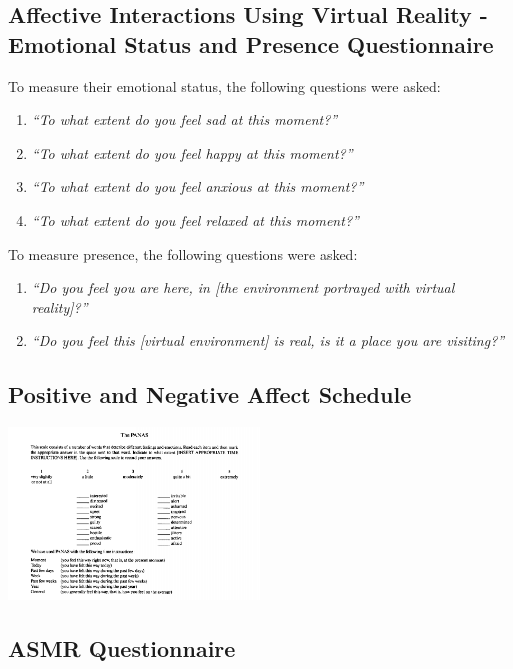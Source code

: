 \documentclass{sigchi}
\newcommand{\inlinequote}[1]{\textit{``#1''}}
\begin{document}
\subsection{Affective Interactions Using Virtual Reality - Emotional Status and Presence Questionnaire}
To measure their emotional status, the following questions were asked:
\begin{enumerate}
	\item{\inlinequote{To what extent do you feel sad at this moment?}}
	\item{\inlinequote{To what extent do you feel happy at this	moment?}}
	\item{\inlinequote{To what extent do you feel anxious at this moment?}}
	\item{\inlinequote{To what extent do you feel relaxed at this moment?}}
\end{enumerate}

To measure presence, the following questions were asked:
\begin{enumerate}
	\item{\inlinequote{Do you feel you are here, in [the environment portrayed with virtual reality]?}}
	\item{\inlinequote{Do you feel this [virtual environment] is real, is it a place you are visiting?}}
\end{enumerate}

\subsection{Positive and Negative Affect Schedule}
\includegraphics[width=0.5\textwidth]{questionnaires/ThePANAS.png}

\subsection{ASMR Questionnaire}

\end{document}
